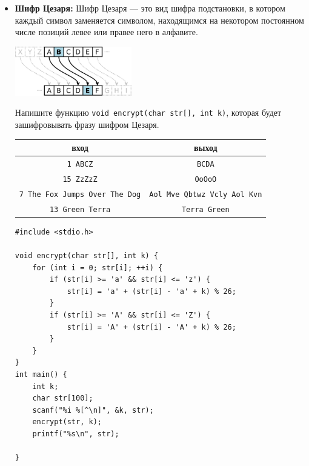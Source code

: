 \documentclass{article}
\begin{document}
\begin{itemize}
\begin{lstlisting}[backgroundcolor = \color{solcolor}]
void to_upper_case(char str[]) {
    for (int i = 0; str[i]; ++i) {
        if (str[i] >= 'a' && str[i] <= 'z') {
            str[i] -= 'a' - 'A';
        }
    }
}
int main() {
    char str[100];
    scanf("%s", str);
    to_upper_case(str);
    printf("%s\n", str);   
}
\end{lstlisting}

\item \textbf{Шифр Цезаря:} Шифр Цезаря — это вид шифра подстановки, в котором каждый символ заменяется символом, находящимся на некотором постоянном числе позиций левее или правее него в алфавите. 
\begin{center}
\includegraphics[width=0.4\textwidth]{../images/caesar.png}
\end{center}
Напишите функцию \texttt{void encrypt(char str[], int k)}, которая будет зашифровывать фразу шифром Цезаря.
\begin{center}
\begin{tabular}{ c | c }
 вход & выход \\ \hline
 \texttt{1 ABCZ} & \texttt{BCDA}\\
 \texttt{15 ZzZzZ} & \texttt{OoOoO} \\
 \texttt{7 The Fox Jumps Over The Dog} & \texttt{Aol Mve Qbtwz Vcly Aol Kvn} \\
 \texttt{13  Green Terra} & \texttt{Terra Green}
\end{tabular}
\end{center}

\begin{lstlisting}[backgroundcolor = \color{solcolor}]
#include <stdio.h>

void encrypt(char str[], int k) {
    for (int i = 0; str[i]; ++i) {
        if (str[i] >= 'a' && str[i] <= 'z') {
            str[i] = 'a' + (str[i] - 'a' + k) % 26;
        }
        if (str[i] >= 'A' && str[i] <= 'Z') {
            str[i] = 'A' + (str[i] - 'A' + k) % 26;
        }
    }
}
int main() {
    int k;
    char str[100];
    scanf("%i %[^\n]", &k, str);
    encrypt(str, k);
    printf("%s\n", str);
    
}
\end{lstlisting}


\end{itemize}
\end{document}
